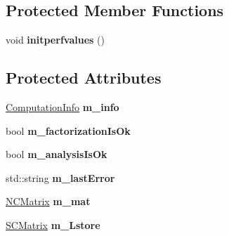 \subsection*{Protected Member Functions}
\begin{DoxyCompactItemize}
\item 
\mbox{\label{class_eigen_1_1_sparse_l_u_a38372b5d6f461e3a92fc7c8fb621b730}} 
void {\bfseries initperfvalues} ()
\end{DoxyCompactItemize}
\subsection*{Protected Attributes}
\begin{DoxyCompactItemize}
\item 
\mbox{\label{class_eigen_1_1_sparse_l_u_a3b8c30dd64606c6396b04c052bc88a80}} 
\mbox{\hyperlink{group__enums_ga85fad7b87587764e5cf6b513a9e0ee5e}{Computation\+Info}} {\bfseries m\+\_\+info}
\item 
\mbox{\label{class_eigen_1_1_sparse_l_u_a0f9049c98a8f53316c2ed9daa49c7db5}} 
bool {\bfseries m\+\_\+factorization\+Is\+Ok}
\item 
\mbox{\label{class_eigen_1_1_sparse_l_u_a9a135b7a2548570384702a3d016043f6}} 
bool {\bfseries m\+\_\+analysis\+Is\+Ok}
\item 
\mbox{\label{class_eigen_1_1_sparse_l_u_abc89f4bf70115b56c4eab39d7f39a88d}} 
std\+::string {\bfseries m\+\_\+last\+Error}
\item 
\mbox{\label{class_eigen_1_1_sparse_l_u_a0489466ddda50b9200444031544d317f}} 
\mbox{\hyperlink{class_eigen_1_1_sparse_matrix}{N\+C\+Matrix}} {\bfseries m\+\_\+mat}
\item 
\mbox{\label{class_eigen_1_1_sparse_l_u_a33a260e5b5860fa9e2a995d89f71234f}} 
\mbox{\hyperlink{class_eigen_1_1internal_1_1_mapped_super_nodal_matrix}{S\+C\+Matrix}} {\bfseries m\+\_\+\+Lstore}
\item 
\mbox{\label{class_eigen_1_1_sparse_l_u_a5866894fb3bc03bf16c1c9c04a73610f}} 

\end{DoxyCompactItemize}

